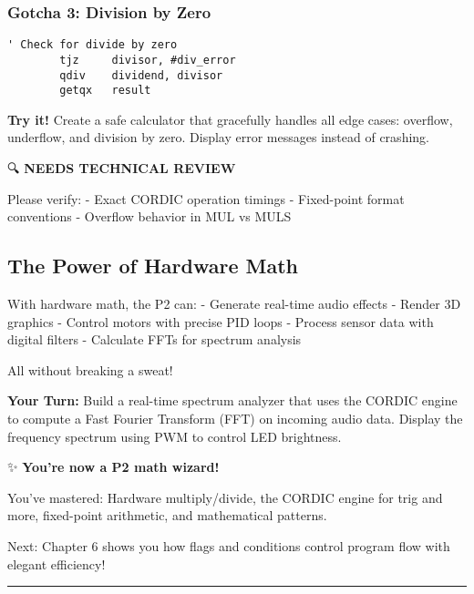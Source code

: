 \documentclass[11pt]{book}
\begin{document}
\hypertarget{gotcha-3-division-by-zero}{%
\subsubsection{Gotcha 3: Division by
Zero}\label{gotcha-3-division-by-zero}}

\begin{lstlisting}
' Check for divide by zero
        tjz     divisor, #div_error
        qdiv    dividend, divisor
        getqx   result
\end{lstlisting}

\textbf{Try it!} Create a safe calculator that gracefully handles all
edge cases: overflow, underflow, and division by zero. Display error
messages instead of crashing.

\begin{review}
🔍 \textbf{NEEDS TECHNICAL REVIEW}

Please verify:
- Exact CORDIC operation timings
- Fixed-point format conventions
- Overflow behavior in MUL vs MULS
\end{review}

\hypertarget{the-power-of-hardware-math}{%
\subsection{The Power of Hardware
Math}\label{the-power-of-hardware-math}}

With hardware math, the P2 can: - Generate real-time audio effects -
Render 3D graphics - Control motors with precise PID loops - Process
sensor data with digital filters - Calculate FFTs for spectrum analysis

All without breaking a sweat!

\textbf{Your Turn:} Build a real-time spectrum analyzer that uses the
CORDIC engine to compute a Fast Fourier Transform (FFT) on incoming
audio data. Display the frequency spectrum using PWM to control LED
brightness.

\begin{chapterend}
✨ \textbf{You're now a P2 math wizard!}

You've mastered: Hardware multiply/divide, the CORDIC engine for trig and more, fixed-point arithmetic, and mathematical patterns.

Next: Chapter 6 shows you how flags and conditions control program flow with elegant efficiency!
\end{chapterend}

\begin{center}\rule{0.5\linewidth}{0.5pt}\end{center}
\end{document}
